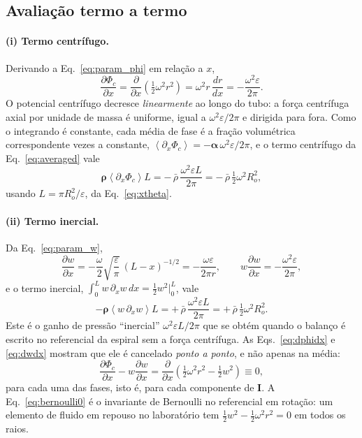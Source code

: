\documentclass[aps,pre,twocolumn,superscriptaddress,nofootinbib,floatfix]{revtex4-2}
\newcommand{\avg}[1]{\left\langle #1 \right\rangle}
\begin{document}
\subsection{Avaliação termo a termo}

\paragraph*{(i) Termo centrífugo.} Derivando a Eq.~\eqref{eq:param_phi} em relação a $x$,
\begin{equation}
  \frac{\partial\Phi_c}{\partial x} = \frac{\partial}{\partial x}\left(\tfrac12\omega^2r^2\right)
  = \omega^2r\,\frac{dr}{dx} = -\frac{\omega^2\varepsilon}{2\pi} .
  \label{eq:dphidx}
\end{equation}
O potencial centrífugo decresce \emph{linearmente} ao longo do tubo: a força centrífuga axial por unidade de massa é uniforme, igual a $\omega^2\varepsilon/2\pi$ e dirigida para fora. Como o integrando é constante, cada média de fase é a fração volumétrica correspondente vezes a constante, $\avg{\partial_x\Phi_c}=-\bm\alpha\,\omega^2\varepsilon/2\pi$, e o termo centrífugo da Eq.~\eqref{eq:averaged} vale
\begin{equation}
  \bm\rho\avg{\partial_x\Phi_c}L = -\,\bar\rho\,\frac{\omega^2\varepsilon L}{2\pi} = -\,\bar\rho\,\tfrac12\omega^2R_o^2 ,
  \label{eq:term_c}
\end{equation}
usando $L=\pi R_o^2/\varepsilon$, da Eq.~\eqref{eq:xtheta}.

\paragraph*{(ii) Termo inercial.} Da Eq.~\eqref{eq:param_w},
\begin{equation}
  \frac{\partial w}{\partial x} = -\frac{\omega}{2}\sqrt{\frac{\varepsilon}{\pi}}\,(L-x)^{-1/2} = -\frac{\omega\varepsilon}{2\pi r},
  \qquad
  w\frac{\partial w}{\partial x} = -\frac{\omega^2\varepsilon}{2\pi},
  \label{eq:dwdx}
\end{equation}
e o termo inercial, $\int_0^L w\,\partial_xw\,dx=\tfrac12 w^2\big|_0^L$, vale
\begin{equation}
  -\bm\rho\avg{w\,\partial_xw}L = +\,\bar\rho\,\frac{\omega^2\varepsilon L}{2\pi} = +\,\bar\rho\,\tfrac12\omega^2R_o^2 .
  \label{eq:term_i}
\end{equation}
Este é o ganho de pressão ``inercial'' $\omega^2\varepsilon L/2\pi$ que se obtém quando o balanço é escrito no referencial da espiral sem a força centrífuga. As Eqs.~\eqref{eq:dphidx} e \eqref{eq:dwdx} mostram que ele é cancelado \emph{ponto a ponto}, e não apenas na média:
\begin{equation}
  \frac{\partial\Phi_c}{\partial x} - w\frac{\partial w}{\partial x}
  = \frac{\partial}{\partial x}\left(\tfrac12\omega^2r^2-\tfrac12w^2\right) \equiv 0 ,
  \label{eq:bernoulli0}
\end{equation}
para cada uma das fases, isto é, para cada componente de $\mathbf I$. A Eq.~\eqref{eq:bernoulli0} é o invariante de Bernoulli no referencial em rotação: um elemento de fluido em repouso no laboratório tem $\tfrac12w^2-\tfrac12\omega^2r^2=0$ em todos os raios.
\end{document}
